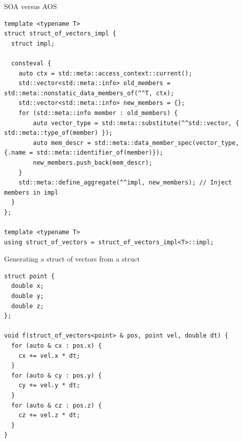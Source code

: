 \begin{frame}[t,fragile]{SOA versus AOS}
\begin{lstlisting}
template <typename T>
struct struct_of_vectors_impl {
  struct impl;

  consteval {
    auto ctx = std::meta::access_context::current();
    std::vector<std::meta::info> old_members = std::meta::nonstatic_data_members_of(^^T, ctx);
    std::vector<std::meta::info> new_members = {};
    for (std::meta::info member : old_members) {
        auto vector_type = std::meta::substitute(^^std::vector, { std::meta::type_of(member) });
        auto mem_descr = std::meta::data_member_spec(vector_type, {.name = std::meta::identifier_of(member)});
        new_members.push_back(mem_descr);
    }
    std::meta::define_aggregate(^^impl, new_members); // Inject members in impl
  }
};

template <typename T>
using struct_of_vectors = struct_of_vectors_impl<T>::impl;
\end{lstlisting}
\end{frame}

\begin{frame}[t,fragile]{Generating a struct of vectors from a struct}
\begin{lstlisting}
struct point {
  double x;
  double y;
  double z;
};

void f(struct_of_vectors<point> & pos, point vel, double dt) {
  for (auto & cx : pos.x) {
    cx += vel.x * dt;
  }
  for (auto & cy : pos.y) {
    cy += vel.y * dt;
  }
  for (auto & cz : pos.z) {
    cz += vel.z * dt;
  }
}
\end{lstlisting}
\end{frame}